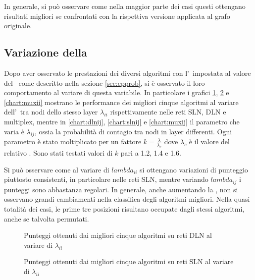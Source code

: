 In generale, si può osservare come nella maggior parte dei casi questi ottengano risultati migliori se confrontati con 
la rispettiva versione applicata al grafo originale. 






\subsection{Variazione della \epprob}

Dopo aver osservato le prestazioni dei diversi algoritmi con l'\epprob\ impostata al valore del \crepp\ come 
descritto nella sezione \vref{sec:epprob}, si è osservato il loro comportamento al variare di questa variabile.
In particolare i grafici \ref{chart:dlnii}, \ref{chart:slnii} e \ref{chart:muxii} mostrano le performance dei 
migliori cinque algoritmi al variare dell'\epprob\ tra nodi dello stesso layer $\lambda_{ii}$ rispettivamente nelle 
reti SLN, DLN e multiplex, mentre in \ref{chart:dlnij}, \ref{chart:slnij} e \ref{chart:muxij} il parametro che varia è $\lambda_{ij}$, ossia
la probabilità di contagio tra nodi in layer differenti.
Ogni parametro è stato moltiplicato per un fattore $k = \frac{\lambda}{\lambda_c}$ dove $\lambda_c$ è il valore del relativo \crepp.
Sono stati testati valori di $k$ pari a \num{1.2}, \num{1.4} e \num{1.6}.

Si può osservare come al variare di $lambda_{ii}$ si ottengano variazioni di punteggio piuttosto consistenti, in particolare nelle 
reti SLN, mentre variando $lambda_{ij}$ i punteggi sono abbastanza regolari.
In generale, anche aumentando la \epprob, non si osservano grandi cambiamenti nella classifica degli algoritmi migliori.
Nella quasi totalità dei casi, le prime tre posizioni risultano occupate dagli stessi algoritmi, anche se talvolta 
permutati. 


\begin{figure}
    \centering
    \resizebox{\textwidth}{!}{}
    
    \caption{Punteggi ottenuti dai migliori cinque algoritmi su reti DLN al variare di $\lambda_{ii}$}
    \label{chart:dlnii}
\end{figure}

\begin{figure}
    \centering
    \resizebox{\textwidth}{!}{}
    
    \caption{Punteggi ottenuti dai migliori cinque algoritmi su reti SLN al variare di $\lambda_{ii}$}
    \label{chart:slnii}
\end{figure}


